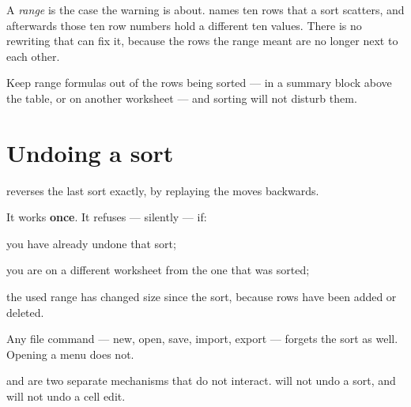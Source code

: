 \begin{cccaution}
A \emph{range} is the case the warning is about.  names ten
rows that a sort scatters, and afterwards those ten row numbers hold a
different ten values. There is no rewriting that can fix it, because the rows
the range meant are no longer next to each other.

Keep range formulas out of the rows being sorted --- in a summary block above
the table, or on another worksheet --- and sorting will not disturb them.
\end{cccaution}

\section{Undoing a sort}

 reverses the last sort exactly, by replaying the
moves backwards.

It works \textbf{once}. It refuses --- silently --- if:

\begin{ccsteps}
\item you have already undone that sort;
\item you are on a different worksheet from the one that was sorted;
\item the used range has changed size since the sort, because rows have been
added or deleted.
\end{ccsteps}

Any file command --- new, open, save, import, export --- forgets the sort as
well. Opening a menu does not.

\begin{ccnote}
 and   are two separate mechanisms
that do not interact.  will not undo a sort, and 
will not undo a cell edit.
\end{ccnote}
